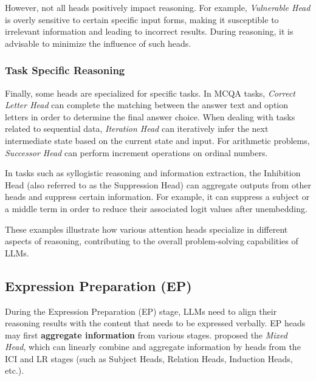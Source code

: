 \documentclass[12pt,letterpaper]{article}
\begin{document}
However, not all heads positively impact reasoning. For example, \textit{Vulnerable Head} is overly sensitive to certain specific input forms, making it susceptible to irrelevant information and leading to incorrect results.\citep{VulnerableHead_24_arXiv_Alicante} During reasoning, it is advisable to minimize the influence of such heads.

\subsubsection*{Task Specific Reasoning} \label{subsubsec:TaskSpecific}
Finally, some heads are specialized for specific tasks.
In MCQA tasks, \textit{Correct Letter Head} can complete the matching between the answer text and option letters in order to determine the final answer choice.\citep{CorrectLetterHead_23_arXiv_DeepMind}
When dealing with tasks related to sequential data, \textit{Iteration Head} can iteratively infer the next intermediate state based on the current state and input.\citep{IterationHead_24_arXiv_Meta}
For arithmetic problems, \textit{Successor Head} can perform increment operations on ordinal numbers.\citep{SuccessorHead_24_ICLR_Cambridge}

In tasks such as syllogistic reasoning and information extraction, the Inhibition Head (also referred to as the Suppression Head) can aggregate outputs from other heads and suppress certain information. For example, it can suppress a subject or a middle term in order to reduce their associated logit values after unembedding.\citep{IOI_23_ICLR_Redwood,HeadCooperation_24_arXiv_UoM}

These examples illustrate how various attention heads specialize in different aspects of reasoning, contributing to the overall problem-solving capabilities of LLMs.

\subsection*{Expression Preparation (EP)} \label{subsec:EP}

During the Expression Preparation (EP) stage, LLMs need to align their reasoning results with the content that needs to be expressed verbally.  EP heads may first \textbf{aggregate information} from various stages.
\citet{FactualRecall_24_arXiv_Independent} proposed the \textit{Mixed Head}, which can linearly combine and aggregate information  by heads from the ICI and LR stages (such as Subject Heads, Relation Heads, Induction Heads, etc.). 
\end{document}
